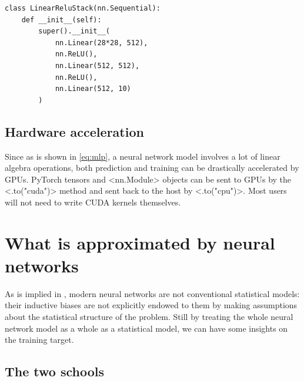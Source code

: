 \documentclass[hyperref, a4paper, 12pt]{report}
\def\texttt#1{<#1>}%
\newcommand{\shortcode}[1]{\texttt{#1}}
\begin{document}
\begin{lstlisting}
class LinearReluStack(nn.Sequential):
    def __init__(self):
        super().__init__(
            nn.Linear(28*28, 512),
            nn.ReLU(),
            nn.Linear(512, 512),
            nn.ReLU(),
            nn.Linear(512, 10)
        )
\end{lstlisting}

\subsection{Hardware acceleration}
Since as is shown in \eqref{eq:mlp}, a neural network model involves a lot of linear algebra operations,
both prediction and training can be drastically accelerated by GPUs.
PyTorch tensors and \shortcode{nn.Module} objects can be sent to GPUs
by the \shortcode{.to("cuda")} method and sent back to the host by \shortcode{.to("cpu")}.
Most users will not need to write CUDA kernels themselves.

\section{What is approximated by neural networks}\label{sec:framework.statistics}

As is implied in ,
modern neural networks are not conventional statistical models:
their inductive biases are not explicitly endowed to them by making assumptions about the statistical structure of the problem.
Still by treating the whole neural network model as a whole as a statistical model,
we can have some insights on the training target. 

\subsection{The two schools}
\end{document}
